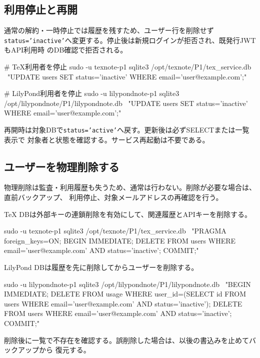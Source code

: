 \documentclass[uplatex,a4paper,11pt]{jsarticle}
\begin{document}
\subsection{利用停止と再開}

通常の解約・一時停止では履歴を残すため、ユーザー行を削除せず
\texttt{status='inactive'}へ変更する。停止後は新規ログインが拒否され、既発行JWTもAPI利用時
のDB確認で拒否される。

\begin{command}
# TeX利用者を停止
sudo -u texnote-p1 sqlite3 /opt/texnote/P1/tex_service.db \
  "UPDATE users SET status='inactive' WHERE email='user@example.com';"

# LilyPond利用者を停止
sudo -u lilypondnote-p1 sqlite3 /opt/lilypondnote/P1/lilypondnote.db \
  "UPDATE users SET status='inactive' WHERE email='user@example.com';"
\end{command}

再開時は対象DBで\texttt{status='active'}へ戻す。更新後は必ずSELECTまたは一覧表示で
対象者と状態を確認する。サービス再起動は不要である。

\subsection{ユーザーを物理削除する}

物理削除は監査・利用履歴も失うため、通常は行わない。削除が必要な場合は、直前バックアップ、
利用停止、対象メールアドレスの再確認を行う。

TeX DBは外部キーの連鎖削除を有効にして、関連履歴とAPIキーを削除する。

\begin{command}
sudo -u texnote-p1 sqlite3 /opt/texnote/P1/tex_service.db \
  "PRAGMA foreign_keys=ON;
   BEGIN IMMEDIATE;
   DELETE FROM users WHERE email='user@example.com' AND status='inactive';
   COMMIT;"
\end{command}

LilyPond DBは履歴を先に削除してからユーザーを削除する。

\begin{command}
sudo -u lilypondnote-p1 sqlite3 /opt/lilypondnote/P1/lilypondnote.db \
  "BEGIN IMMEDIATE;
   DELETE FROM usage WHERE user_id=(SELECT id FROM users
     WHERE email='user@example.com' AND status='inactive');
   DELETE FROM users WHERE email='user@example.com' AND status='inactive';
   COMMIT;"
\end{command}

削除後に一覧で不存在を確認する。誤削除した場合は、以後の書込みを止めてバックアップから
復元する。
\end{document}
